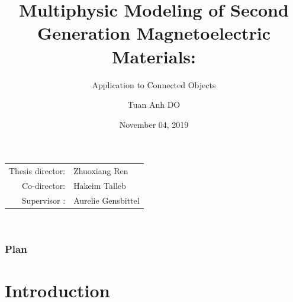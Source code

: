 \documentclass[compress]{beamer}
\author{Tuan Anh DO}
\title{\large Multiphysic Modeling of Second Generation Magnetoelectric Materials:}
\subtitle{Application to Connected Objects}
\institute{{\color{blue} \textbf{\large PhD Thesis Defense}}}
\date{{\color{letterfoot} November 04, 2019}}
\begin{document}
 
\begin{frame}[plain]
\maketitle
\small
\vspace*{0.5cm}
\centering
\begin{tabular}[t]{rl}
Thesis director: & Zhuoxiang Ren \\ [0.2cm]
Co-director: & Hakeim Talleb \\ [0.2cm]
Supervisor : & Aurelie Gensbittel \\
\end{tabular} \\
\end{frame}

\begin{frame}\frametitle{Plan}
\tableofcontents
\end{frame}


\section{Introduction}
\end{document}
